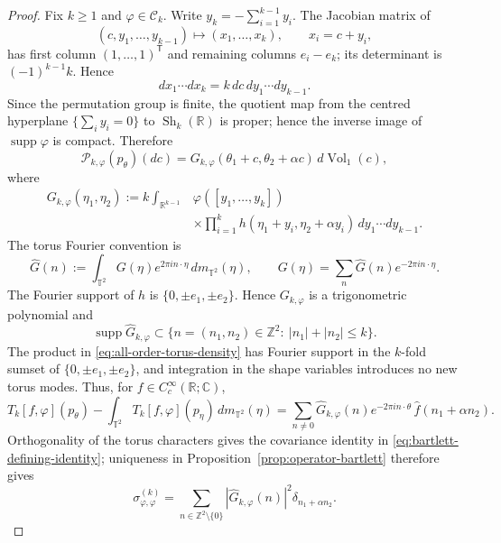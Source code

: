 \documentclass[11pt,reqno,a4paper]{amsart}
\numberwithin{equation}{section}
\theoremstyle{compact}
\theoremstyle{definition}
\theoremstyle{definition}
\newcommand{\Vol}{\operatorname{Vol}}
\newcommand{\Sh}{\operatorname{Sh}}
\begin{document}
\begin{proof}
Fix $k\geq1$ and $\varphi\in\mathcal C_k$.  Write
$y_k=-\sum_{i=1}^{k-1}y_i$.  The Jacobian matrix of
\[
  (c,y_1,\ldots,y_{k-1})\longmapsto(x_1,\ldots,x_k),
  \qquad x_i=c+y_i,
\]
has first column $(1,\ldots,1)^\mathsf T$ and remaining columns
$e_i-e_k$; its determinant is $(-1)^{k-1}k$.  Hence
\[
  dx_1\cdots dx_k=k\,dc\,dy_1\cdots dy_{k-1}.
\]
Since the permutation group is finite, the quotient map from the centred
hyperplane $\{\sum_i y_i=0\}$ to $\Sh_k(\mathbb R)$ is proper; hence the
inverse image of $\operatorname{supp}\varphi$ is compact.  Therefore
\begin{equation}\label{eq:all-order-derived-density}
  \mathcal P_{k,\varphi}(p_\theta)(dc)
  =G_{k,\varphi}(\theta_1+c,\theta_2+\alpha c)\,d\Vol_1(c),
\end{equation}
where
\begin{align}\label{eq:all-order-torus-density}
  G_{k,\varphi}(\eta_1,\eta_2)
  :=k\int_{\mathbb R^{k-1}}
   &\varphi([y_1,\ldots,y_k])\nonumber\\
   &\times\prod_{i=1}^k
      h(\eta_1+y_i,\eta_2+\alpha y_i)
      \,dy_1\cdots dy_{k-1}.
\end{align}
The torus Fourier convention is
\[
  \widehat G(n):=\int_{\mathbb T^2}G(\eta)e^{2\pi i n\cdot\eta}
  \,dm_{\mathbb T^2}(\eta),
  \qquad
  G(\eta)=\sum_n\widehat G(n)e^{-2\pi i n\cdot\eta}.
\]
The Fourier support of $h$ is $\{0,\pm e_1,\pm e_2\}$.  Hence
$G_{k,\varphi}$ is a trigonometric polynomial and
\begin{equation}\label{eq:all-order-fourier-support}
  \operatorname{supp}\widehat G_{k,\varphi}
  \subset
  \{n=(n_1,n_2)\in\mathbb Z^2:\ |n_1|+|n_2|\leq k\}.
\end{equation}
The product in \eqref{eq:all-order-torus-density} has Fourier support in the
$k$-fold sumset of $\{0,\pm e_1,\pm e_2\}$, and integration in the shape
variables introduces no new torus modes.  Thus, for
$f\in C_c^\infty(\mathbb R;\mathbb C)$,
\[
  T_k[f,\varphi](p_\theta)-\int_{\mathbb T^2}T_k[f,\varphi](p_\eta)
  \,dm_{\mathbb T^2}(\eta)
  =\sum_{n\neq0}\widehat G_{k,\varphi}(n)
    e^{-2\pi i n\cdot\theta}\,
    \widehat f(n_1+\alpha n_2).
\]
Orthogonality of the torus characters gives the covariance identity in
\eqref{eq:bartlett-defining-identity}; uniqueness in
Proposition~\ref{prop:operator-bartlett} therefore gives
\begin{equation}\label{eq:all-order-diffuse-bartlett}
  \sigma^{(k)}_{\varphi,\varphi}
  =\sum_{n\in\mathbb Z^2\setminus\{0\}}
      |\widehat G_{k,\varphi}(n)|^2
      \delta_{n_1+\alpha n_2}.

\end{equation}
\end{proof}
\end{document}
